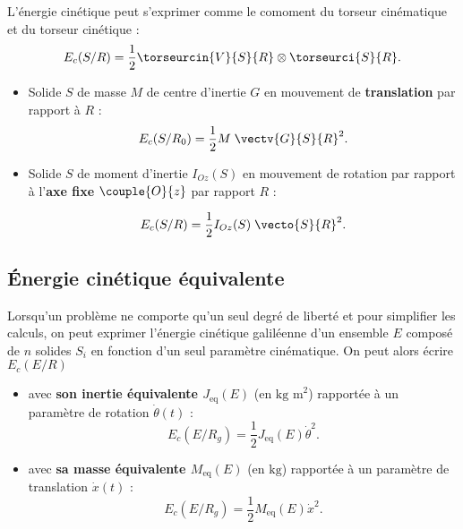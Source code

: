 
\begin{defi}
L'énergie cinétique peut s'exprimer comme le comoment du torseur cinématique et du torseur cinétique :
$$E_c(S/R)=\frac{1}{2}\torseurcin{V}{S}{R}\otimes \torseurci{S}{R}.
$$
\end{defi}


\begin{prop}

\begin{itemize}
\item Solide $S$ de masse $M$ de centre d'inertie $G$ en mouvement de \textbf{translation} par rapport à $R$ :
$$
E_c(S/R_0)=\frac{1}{2}M \; \vectv{G}{S}{R}^2.
$$

\item Solide $S$ de moment d'inertie $I_{Oz}(S)$ en mouvement de rotation par rapport à l'\textbf{axe fixe} $\couple{O}{{z}}$ par rapport $R$ :

$$
E_c(S/R)=\frac{1}{2}I_{Oz}(S)\; \vecto{S}{R}^2.
$$

\end{itemize}
\end{prop}



\subsection{Énergie cinétique équivalente}

\begin{defi}

Lorsqu'un problème ne comporte qu'un seul degré de liberté et pour simplifier les calculs, on peut exprimer l'énergie cinétique galiléenne d'un ensemble $E$ composé de $n$ solides $S_i$ en fonction d'un seul paramètre cinématique.
On peut alors écrire $E_c(E/R)$ 
\begin{itemize}
\item avec \textbf{son inertie équivalente $J_{\text{eq}}(E)$} (en $\text{kg m}^2$) rapportée à un paramètre de rotation $\dot{\theta}(t)$ : 
$$
E_c(E/R_g)=\frac{1}{2}J_{\text{eq}}(E) \dot{\theta}^2.
$$
\item avec \textbf{sa masse équivalente $M_{\text{eq}}(E)$} (en $\text{kg}$) rapportée à un paramètre de translation $\dot{x}(t)$ : 
$$
E_c(E/R_g)=\frac{1}{2}M_{\text{eq}}(E) \dot{x}^2.
$$
\end{itemize}
\end{defi}

